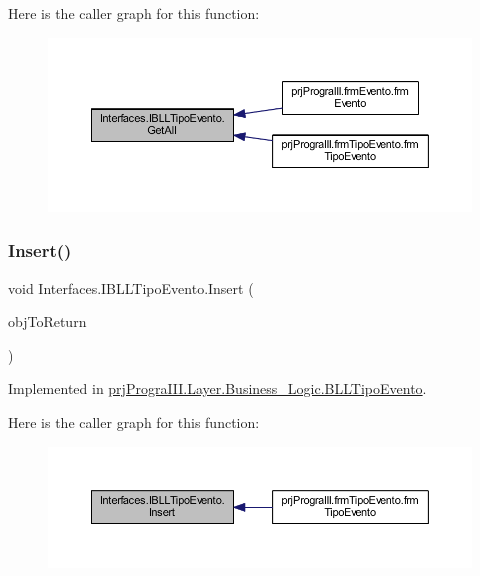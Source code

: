 Here is the caller graph for this function\+:
\nopagebreak
\begin{figure}[H]
\begin{center}
\leavevmode
\includegraphics[width=350pt]{interface_interfaces_1_1_i_b_l_l_tipo_evento_a9491bc76d279f88a5f33ce3a63c84302_icgraph}
\end{center}
\end{figure}
\hypertarget{interface_interfaces_1_1_i_b_l_l_tipo_evento_abe3b18cdc875d0c08853478dd9720af4}{}\label{interface_interfaces_1_1_i_b_l_l_tipo_evento_abe3b18cdc875d0c08853478dd9720af4} 
\subsubsection{\texorpdfstring{Insert()}{Insert()}}
{\footnotesize\ttfamily void Interfaces.\+I\+B\+L\+L\+Tipo\+Evento.\+Insert (\begin{DoxyParamCaption}\item[{\hyperlink{classprj_progra_i_i_i_1_1_layer_1_1_entities_1_1_tipo_evento}{Tipo\+Evento}}]{obj\+To\+Return }\end{DoxyParamCaption})}



Implemented in \hyperlink{classprj_progra_i_i_i_1_1_layer_1_1_business___logic_1_1_b_l_l_tipo_evento_a3edf9ef41a8df3294c6765b55338a750}{prj\+Progra\+I\+I\+I.\+Layer.\+Business\+\_\+\+Logic.\+B\+L\+L\+Tipo\+Evento}.

Here is the caller graph for this function\+:
\nopagebreak
\begin{figure}[H]
\begin{center}
\leavevmode
\includegraphics[width=350pt]{interface_interfaces_1_1_i_b_l_l_tipo_evento_abe3b18cdc875d0c08853478dd9720af4_icgraph}
\end{center}
\end{figure}


